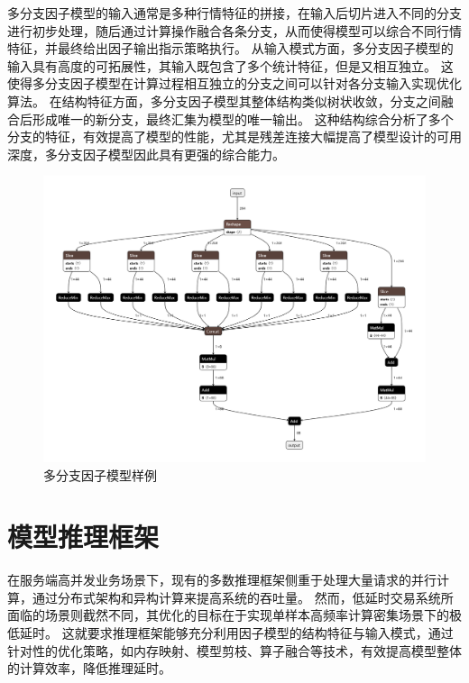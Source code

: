 多分支因子模型的输入通常是多种行情特征的拼接，在输入后切片进入不同的分支进行初步处理，随后通过计算操作融合各条分支，从而使得模型可以综合不同行情特征，并最终给出因子输出指示策略执行。
从输入模式方面，多分支因子模型的输入具有高度的可拓展性，其输入既包含了多个统计特征，但是又相互独立。
这使得多分支因子模型在计算过程相互独立的分支之间可以针对各分支输入实现优化算法。
在结构特征方面，多分支因子模型其整体结构类似树状收敛，分支之间融合后形成唯一的新分支，最终汇集为模型的唯一输出。
这种结构综合分析了多个分支的特征，有效提高了模型的性能，尤其是残差连接\cite{he2015deepresiduallearningimage}大幅提高了模型设计的可用深度，多分支因子模型因此具有更强的综合能力。
\begin{figure}[h]
    \centering
    \includegraphics[width=1\textwidth]{image/chap02/custom_model.onnx.png}
    \caption{多分支因子模型样例}
    \label{fig:models}
\end{figure}


\section{模型推理框架}

在服务端高并发业务场景下，现有的多数推理框架侧重于处理大量请求的并行计算，通过分布式架构和异构计算来提高系统的吞吐量。
然而，低延时交易系统所面临的场景则截然不同，其优化的目标在于实现单样本高频率计算密集场景下的极低延时。
这就要求推理框架能够充分利用因子模型的结构特征与输入模式，通过针对性的优化策略，如内存映射、模型剪枝、算子融合等技术，有效提高模型整体的计算效率，降低推理延时。

